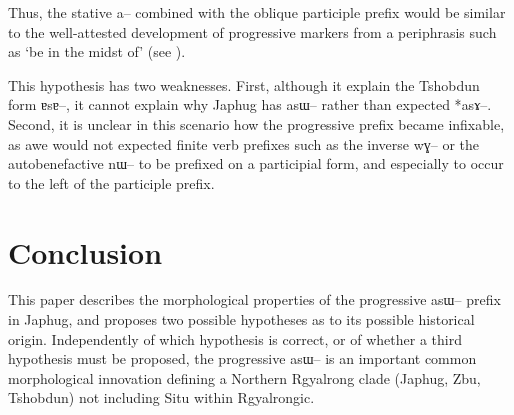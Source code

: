 \documentclass[oldfontcommands,oneside,a4paper,11pt]{article}
\newcommand{\ipa}[1]{{\phon \mbox{#1}}} %
\begin{document}
Thus, the stative \ipa{a--} combined with the oblique participle prefix would be similar to the well-attested development of progressive markers from a periphrasis such as `be in the midst of'  (see \citealt[134-137]{bybee94TAM}).

This hypothesis has two weaknesses. First, although it explain the Tshobdun form \ipa{ɐsɐ--}, it cannot explain why Japhug has \ipa{asɯ--} rather than expected *\ipa{asɤ--}. Second, it is unclear in this scenario how the progressive prefix became infixable, as awe would not expected finite verb prefixes such as the inverse \ipa{wɣ--} or the autobenefactive \ipa{nɯ--} to be prefixed on a participial form, and especially to occur to the left of the participle prefix. 

\section{Conclusion}
This paper describes the morphological properties of the progressive \ipa{asɯ--} prefix in Japhug, and proposes two possible hypotheses as to its possible historical origin. Independently of which hypothesis is correct, or of whether a third hypothesis must be proposed, the progressive \ipa{asɯ--} is an important common morphological innovation defining a Northern Rgyalrong clade (Japhug, Zbu, Tshobdun) not including Situ within Rgyalrongic.

  


\end{document}
